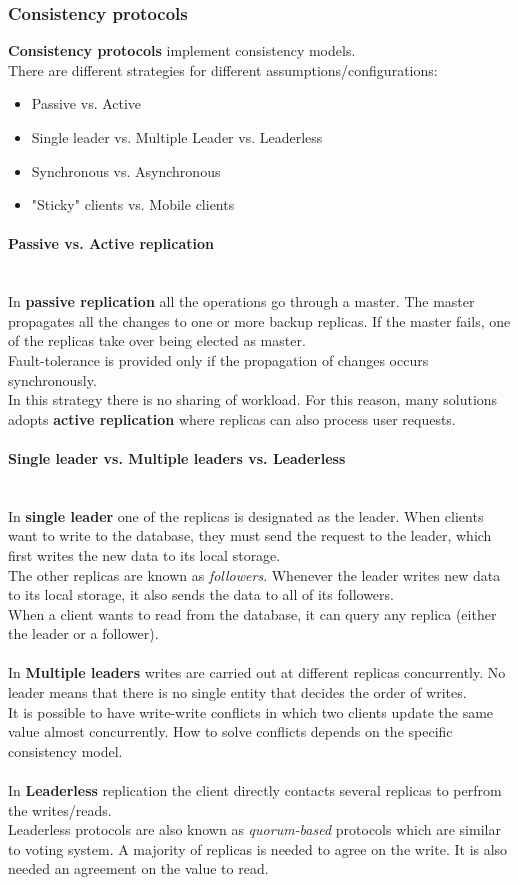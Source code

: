 \documentclass[10pt,a4paper]{article}
\newcommand{\myparagraph}[1]{\paragraph{#1}\mbox{}\\[0.05in]}
\begin{document}
\subsubsection{Consistency protocols}
\textbf{Consistency protocols} implement consistency models. \\
There are different strategies for different assumptions/configurations:
\begin{itemize}
	\item Passive vs. Active
	\item Single leader vs. Multiple Leader vs. Leaderless
	\item Synchronous vs. Asynchronous
	\item "Sticky" clients vs. Mobile clients
\end{itemize}
\myparagraph{Passive vs. Active replication}
In \textbf{passive replication} all the operations go through a master. The master propagates all the changes to one or more backup replicas. If the master fails, one of the replicas take over being elected as master. \\
Fault-tolerance is provided only if the propagation of changes occurs synchronously. \\
In this strategy there is no sharing of workload. For this reason, many solutions adopts \textbf{active replication} where replicas can also process user requests.
\myparagraph{Single leader vs. Multiple leaders vs. Leaderless}
In \textbf{single leader} one of the replicas is designated as the leader. When clients want to write to the database, they must send the request to the leader, which first writes the new data to its local storage. \\ The other replicas are known as \textit{followers}. Whenever the leader writes new data to its local storage, it also sends the data to all of its followers. \\
When a client wants to read from the database, it can query any replica (either the leader or a follower). \\ \\
In \textbf{Multiple leaders} writes are carried out at different replicas concurrently. No leader means that there is no single entity that decides the order of writes.\\ It is possible to have write-write conflicts in which two clients update the same value almost concurrently. How to solve conflicts depends on the specific consistency model. \\ \\
In \textbf{Leaderless} replication the client directly contacts several replicas to perfrom the writes/reads. \\ Leaderless protocols are also known as \textit{quorum-based} protocols which are similar to voting system. A majority of replicas is needed to agree on the write. It is also needed an agreement on the value to read.
\end{document}
